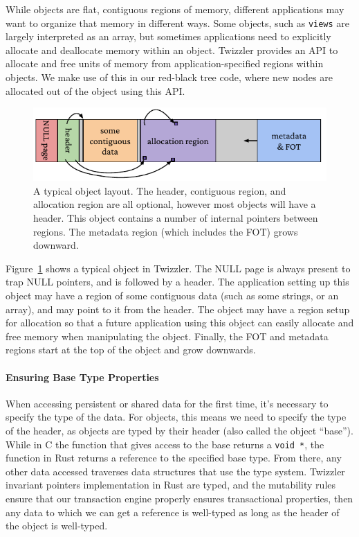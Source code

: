 While objects are flat, contiguous regions of memory, different applications may want to organize
that memory in different ways. Some objects, such as \texttt{views} are largely interpreted as an
array, but sometimes applications need to explicitly allocate and deallocate memory within an object.
Twizzler provides an API to allocate and free units of memory from application-specified regions
within objects. We make use of this in our red-black tree code, where new nodes are allocated out of
the object using this API.

\begin{figure}
    \centering
    \includegraphics[width=\linewidth]{fig/typobj}
    \caption[Typical object layout]{A typical object layout. The header, contiguous region, and allocation region are all
        optional, however most objects will have a header. This object contains a number of internal
        pointers between regions. The metadata region (which includes the FOT) grows downward.}
    \label{fig:typobj}
\end{figure}

Figure~\ref{fig:typobj} shows a typical object in Twizzler. The NULL page is always present to trap
NULL pointers, and is followed by a header. The application setting up this object may have a region
of some contiguous data (such as some strings, or an array), and may point to it from the header.
The object may have a region setup for allocation so that a future application using this
object can easily allocate and free memory when manipulating the object. Finally, the FOT and
metadata regions start at the top of the object and grow downwards.

\paragraph{Ensuring Base Type Properties}

When accessing persistent or shared data for the first time, it's necessary to specify the type of the data. For
objects, this means we need to specify the type of the header, as objects are typed by their header (also called the
object ``base''). While in C the function that gives access to the base returns a \texttt{void *}, the function in Rust
returns a reference to the specified base type. From there, any other data accessed traverses data structures that use
the type system. Twizzler invariant pointers implementation in Rust are typed, and the mutability rules ensure that our
transaction engine properly ensures transactional properties, then any data to which we can get a reference is
well-typed as long as the header of the object is well-typed.

